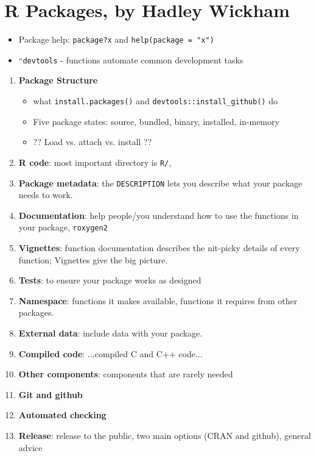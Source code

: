 \documentclass{article}
\begin{document}
\section*{R Packages, by Hadley Wickham}
\begin{itemize}
\item Package help: \verb|package?x| and \verb|help(package = "x")|
\item ``\verb|devtools| - functions automate common development tasks
\end{itemize}

\begin{enumerate}
\item {\bf Package Structure}
  \begin{itemize}
  \item what \verb|install.packages()| and \verb|devtools::install_github()| do
  \item Five package states: source, bundled, binary, installed, in-memory
  \item ?? Load vs. attach vs. install ??
  \end{itemize}
\item {\bf R code}: most important directory is \verb|R/|,
\item {\bf Package metadata}: the \verb|DESCRIPTION| lets you describe what your package needs to work.
\item {\bf Documentation}: help people/you understand how to use the functions in your package, \verb|roxygen2|
\item {\bf Vignettes}: function documentation describes the nit-picky details of every function; Vignettes give the big picture.
\item {\bf Tests}: to ensure your package works as designed
\item {\bf Namespace}: functions it makes available, functions it requires from other packages.
\item {\bf External data}: include data with your package.
\item {\bf Compiled code}: ...compiled C and C++ code...
\item {\bf Other components}: components that are rarely needed
\item {\bf Git and github}
\item {\bf Automated checking}
\item {\bf Release}: release to the public, two main options (CRAN and github), general advice
\end{enumerate}
\end{document}
